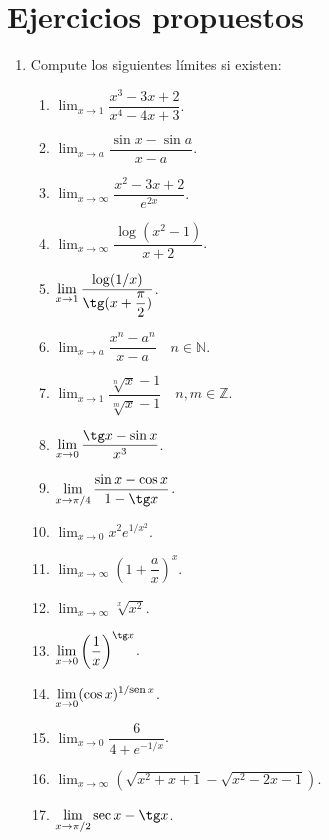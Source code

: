 \section{Ejercicios propuestos}
\begin{enumerate}[leftmargin=*]
\item  Compute los siguientes límites si existen:
      \begin{multicols}{2}
      \begin{enumerate}
      \item  $\displaystyle \lim_{x\rightarrow 1}\dfrac{x^3-3x+2}{x^4-4x+3}$.
      \item  $\displaystyle \lim_{x\rightarrow a}\dfrac{\sin x-\sin a}{x-a}$.
      \item $\displaystyle \lim_{x\rightarrow\infty}\dfrac{x^2-3x+2}{e^{2x}}$.
      \item $\displaystyle \lim_{x\rightarrow\infty}\dfrac{\log(x^2-1)}{x+2}$.
      \item $\displaystyle \lim_{x\rightarrow 1}\dfrac{\log(1/x)}{\tg(x+\dfrac{\pi}{2})}$.
      \item $\displaystyle \lim_{x\rightarrow a}\dfrac{x^n-a^n}{x-a}\quad n\in \mathbb{N}$.
      \item $ \displaystyle \lim_{x\rightarrow 1}\dfrac{\sqrt[n]{x}-1}{\sqrt[m]{x}-1}\quad n,m \in \mathbb{Z}$.
      \item $\displaystyle \lim_{x\rightarrow 0}\dfrac{\tg x-\sin x}{x^3}$.
      \item $\displaystyle \lim_{x\rightarrow \pi/4}\dfrac{\sin x-\cos x}{1-\tg x}$.
      \item $\displaystyle \lim_{x\rightarrow 0}x^2e^{1/x^2}$.
      \item $\displaystyle \lim_{x\rightarrow \infty}\left(1+\dfrac{a}{x}\right)^x$.
      \item $\displaystyle \lim_{x\rightarrow \infty} \sqrt[x]{x^2}$.
      \item $\displaystyle \lim_{x\rightarrow 0}\left(\dfrac{1}{x}\right)^{\tg x}$.
      \item $\displaystyle \lim_{x\rightarrow 0}(\cos x)^{1/\mbox{\footnotesize sen}\, x}$.
      \item $\displaystyle \lim_{x\rightarrow 0}\dfrac{6}{4+e^{-1/x}}$.
      \item $\displaystyle \lim_{x\rightarrow \infty}\left(\sqrt{x^2+x+1}-\sqrt{x^2-2x-1}\right)$.
      \item $\displaystyle \lim_{x\rightarrow \pi/2}\sec x-\tg x$.
      \end{enumerate}
      \end{multicols}


\end{enumerate}
